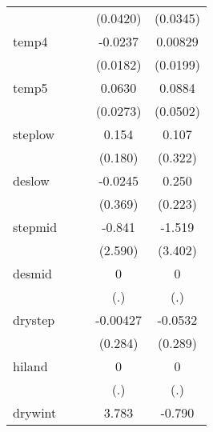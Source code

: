 {\begin{tabular}{l*{4}{c}}
            &                     &                     &    (0.0420)         &    (0.0345)         \\
[1em]
temp4       &                     &                     &     -0.0237         &     0.00829         \\
            &                     &                     &    (0.0182)         &    (0.0199)         \\
[1em]
temp5       &                     &                     &      0.0630\sym{*}  &      0.0884         \\
            &                     &                     &    (0.0273)         &    (0.0502)         \\
[1em]
steplow     &                     &                     &       0.154         &       0.107         \\
            &                     &                     &     (0.180)         &     (0.322)         \\
[1em]
deslow      &                     &                     &     -0.0245         &       0.250         \\
            &                     &                     &     (0.369)         &     (0.223)         \\
[1em]
stepmid     &                     &                     &      -0.841         &      -1.519         \\
            &                     &                     &     (2.590)         &     (3.402)         \\
[1em]
desmid      &                     &                     &           0         &           0         \\
            &                     &                     &         (.)         &         (.)         \\
[1em]
drystep     &                     &                     &    -0.00427         &     -0.0532         \\
            &                     &                     &     (0.284)         &     (0.289)         \\
[1em]
hiland      &                     &                     &           0         &           0         \\
            &                     &                     &         (.)         &         (.)         \\
[1em]
drywint     &                     &                     &       3.783         &      -0.790         \\

\end{tabular}}
